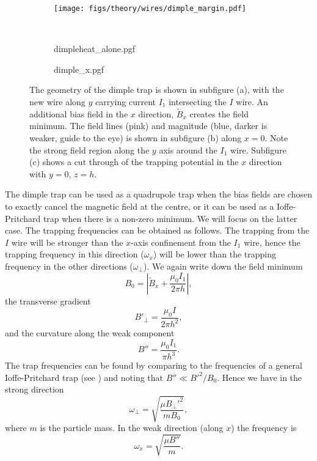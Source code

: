 \begin{figure}[htb]
    \centering
  \begin{subfigure}{0.4\textwidth}
      \centering
      \smallskip
      \texttt{[image: figs/theory/wires/dimple\_margin.pdf]}
  \end{subfigure} \\[3mm]
  \begin{subfigure}[t]{0.4\textwidth}
      \centering
      {dimpleheat_alone.pgf}
  \end{subfigure}
  \begin{subfigure}[t]{0.4\textwidth}
      \centering
      {dimple_x.pgf}
  \end{subfigure}
  \caption[Dimple trap]{
    The geometry of the dimple trap is shown in subfigure (a), with the new
    wire along $y$ carrying current $I_1$ intersecting the $I$ wire. An
    additional bias field in the $x$ direction, $\tilde{B}_x$ creates the field
    minimum. The field lines (pink) and magnitude (blue, darker is weaker,
    guide to the eye) is shown in subfigure (b) along $x=0$. Note the strong
    field region along the $y$ axis around the $I_1$ wire. Subfigure (c) shows
    a cut through of the trapping potential in the $x$ direction with $y=0$,
    $z=h$.
  }
  \label{theory:fig:dimple}
\end{figure}

The dimple trap can be used as a quadrupole trap when the bias fields are
chosen to exactly cancel the magnetic field at the centre, or it can be used as
a Ioffe-Pritchard trap when there is a non-zero minimum. We will focus on the
latter case.
%
The trapping frequencies can be obtained as follows. 
%
The trapping from the $I$ wire will be stronger than the $x$-axis
confinement from the $I_1$ wire, hence the trapping frequency in this
direction ($\omega_x$) will be lower than the trapping frequency in the other
directions ($\omega_\perp$). We again write down the field minimum
%
\begin{equation}
  B_0 = \left|\tilde{B}_x + \frac{\mu_0 I_1}{2\pi h}\right|,
\end{equation}
%
the transverse gradient
%
\begin{equation}
  B'_\perp = \frac{\mu_0 I}{2 \pi h^2},
  \label{theory:eqn:dimplegrad}
\end{equation}
%
and the curvature along the weak component
%
\begin{equation}
  B'' = \frac{\mu_0 I_1}{\pi h^3}.
\end{equation}
%
The trap frequencies can be found by comparing to the frequencies of a general
Ioffe-Pritchard trap (see ) and noting that $B'' \ll
B'^2/B_0$. Hence we have in the strong direction
%
\begin{equation}
  \omega_\perp = \sqrt{\frac{\mu B_\perp'^2}{m B_0}},
  \label{theory:eqn:perpfreq}
\end{equation}
%
where $m$ is the particle mass. In the weak direction (along $x$) the frequency
is
%
\begin{equation}
  \omega_x = \sqrt{\frac{\mu B''}{m}}.
  \label{theory:eqn:xfreq}
\end{equation}

